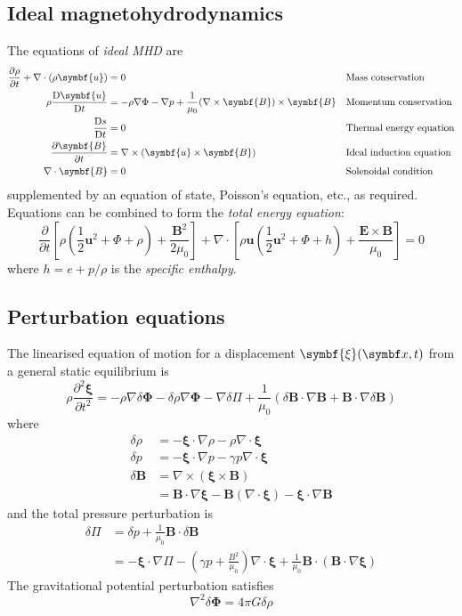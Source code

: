 \documentclass{jknotes}
\newcommand{\B}{\symbf{B}}
\renewcommand{\u}{\symbf{u}}
\newcommand{\flux}{\symbf{\Phi}}
\newcommand{\disp}{\symbf{\xi}}
\begin{document}
\subsection{Ideal magnetohydrodynamics}
The equations of \emph{ideal MHD} are
\begin{align}
	\frac{\partial \rho}{\partial t} + \nabla \cdot (\rho \symbf{u}) &= 0
										&&\text{Mass conservation}\\
	\rho \frac{\diffD \symbf{u}}{\diffD t} &= - \rho \nabla \Phi - \nabla p +
	\frac{1}{\mu_0}(\nabla \times \symbf{B})\times\symbf{B} &&\text{Momentum
	conservation}\\
	\frac{\diffD s}{\diffD t} &= 0 &&\text{Thermal energy equation} \\
	\frac{\partial \symbf{B}}{\partial t} &= \nabla \times (\symbf{u} \times
	\symbf{B}) &&\text{Ideal induction equation}\\
	\nabla \cdot \symbf{B} &= 0 &&\text{Solenoidal condition}
\end{align}
supplemented by an equation of state, Poisson's equation, etc., as required.
Equations can be combined to form the \emph{total energy equation}:
\begin{equation}
	\frac{\partial}{\partial t} \left[ \rho (\frac{1}{2}\u^2 + \Phi +
	\rho) + \frac{\B^2}{2\mu_0} \right] + \nabla \cdot \left[ \rho \u
	(\frac{1}{2}\u^2 + \Phi + h) + \frac{\symbf{E}\times\B}{\mu_0}\right] = 0
\end{equation}
where $h = e + p/\rho$ is the \emph{specific enthalpy}.

\subsection{Perturbation equations}
The linearised equation of motion for a displacement $\disp(\x,t)$ from a
general static equilibrium is
\begin{equation}
	\rho \frac{\partial^2 \disp}{\partial t^2} = -\rho \nabla \delta \flux -
	\delta \rho \nabla \flux - \nabla \delta \Pi + \frac{1}{\mu_0}(\delta \B
	\cdot \nabla \B + \B \cdot \nabla \delta \B)
\end{equation}
where
\begin{align}
	\delta \rho &= -\disp \cdot \nabla \rho - \rho \nabla \cdot \disp \\
	\delta p &= -\disp \cdot \nabla p - \gamma p \nabla \cdot \disp \\
	\delta \B &= \nabla \times (\disp \times \B) \\
			  &= \B \cdot \nabla \disp - \B (\nabla \cdot \disp) - \disp \cdot
			  \nabla \B
\end{align}
and the total pressure perturbation is
\begin{align}
	\delta \Pi &= \delta p + \frac{1}{\mu_0}\B \cdot \delta \B \\
			   &= -\disp \cdot \nabla \Pi - \left(\gamma p +
			   \frac{B^2}{\mu_0}\right)\nabla \cdot \disp + \frac{1}{\mu_0} \B \cdot
			   (\B \cdot \nabla \disp)
\end{align}
The gravitational potential perturbation satisfies
\begin{equation}
	\nabla^2 \delta \flux = 4\pi G \delta \rho
\end{equation}
\end{document}
